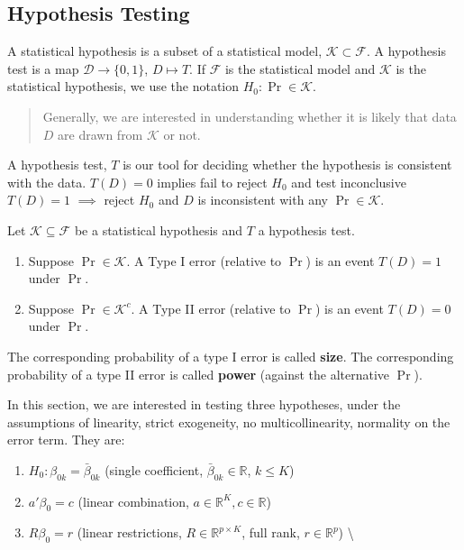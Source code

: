 \documentclass[12pt,]{book}
\providecommand{\tightlist}{%
  \setlength{\itemsep}{0pt}\setlength{\parskip}{0pt}}
\begin{document}
\hypertarget{hypothesis-testing}{%
\subsection{Hypothesis Testing}\label{hypothesis-testing}}

A statistical hypothesis is a subset of a statistical model, \(\mathcal K \subset \mathcal F\). A hypothesis test is a map \(\mathcal D \rightarrow \{ 0,1 \}\), \(D \mapsto T\). If \(\mathcal F\) is the statistical model and \(\mathcal K\) is the statistical hypothesis, we use the notation \(H_0: \Pr \in \mathcal K\).

\begin{quote}
Generally, we are interested in understanding whether it is likely that data \(D\) are drawn from \(\mathcal K\) or not.
\end{quote}

A hypothesis test, \(T\) is our tool for deciding whether the hypothesis is consistent with the data. \(T(D)= 0\) implies fail to reject \(H_0\) and test inconclusive \(T(D)=1\) \(\implies\) reject \(H_0\) and \(D\) is inconsistent with any \(\Pr \in \mathcal K\).

Let \(\mathcal K \subseteq \mathcal F\) be a statistical hypothesis and \(T\) a hypothesis test.

\begin{enumerate}
\def\labelenumi{\arabic{enumi}.}
\tightlist
\item
  Suppose \(\Pr \in \mathcal K\). A Type I error (relative to \(\Pr\)) is an event \(T(D)=1\) under \(\Pr\).\\
\item
  Suppose \(\Pr \in \mathcal K^c\). A Type II error (relative to \(\Pr\)) is an event \(T(D)=0\) under \(\Pr\).
\end{enumerate}

The corresponding probability of a type I error is called \textbf{size}. The corresponding probability of a type II error is called \textbf{power} (against the alternative \(\Pr\)).

In this section, we are interested in testing three hypotheses, under the assumptions of linearity, strict exogeneity, no multicollinearity, normality on the error term. They are:

\begin{enumerate}
\def\labelenumi{\arabic{enumi}.}
\tightlist
\item
  \(H_0: \beta _ {0k} = \bar \beta _ {0k}\) (single coefficient, \(\bar \beta _ {0k} \in \mathbb R\), \(k \leq K\))
\item
  \(a' \beta_0 = c\) (linear combination, \(a \in \mathbb R^K, c \in \mathbb R\))
\item
  \(R \beta_0 = r\) (linear restrictions, \(R \in \mathbb R^{p \times K}\), full rank, \(r \in \mathbb R^p\)) \textbackslash{}
\end{enumerate}
\end{document}
